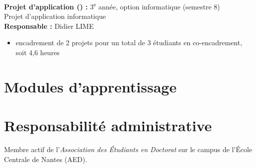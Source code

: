 \bigskip\noindent
\textbf{Projet d'application () :} 3\textsuperscript{e} année, option informatique (semestre 8)\\
Projet d'application informatique\\
\textbf{Responsable :} Didier LIME
\begin{itemize}
  \item encadrement de 2 projets pour un total de 3 étudiants en co-encadrement, soit 4,6 heures
\end{itemize}



\section{Modules d'apprentissage}







\section{Responsabilité administrative}
Membre actif de l'\emph{Association des Étudiants en Doctorat} sur le campus de l'École Centrale de Nantes (AED).
